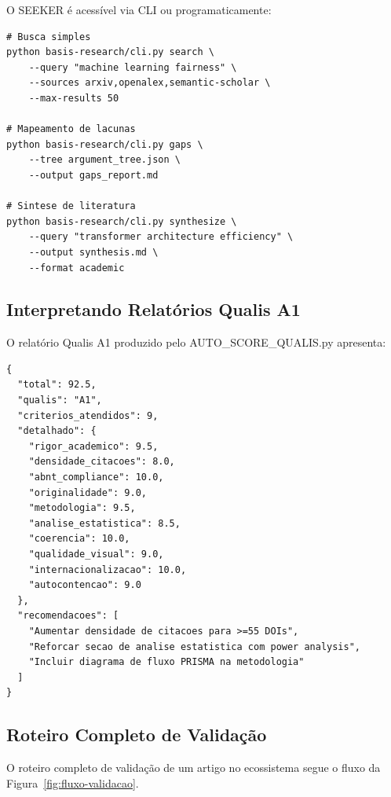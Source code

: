 O SEEKER é acessível via CLI ou programaticamente:

\begin{lstlisting}[caption={Pesquisa com SEEKER},
label={lst:run-seeker}, style=bashstyle]
# Busca simples
python basis-research/cli.py search \
    --query "machine learning fairness" \
    --sources arxiv,openalex,semantic-scholar \
    --max-results 50

# Mapeamento de lacunas
python basis-research/cli.py gaps \
    --tree argument_tree.json \
    --output gaps_report.md

# Sintese de literatura
python basis-research/cli.py synthesize \
    --query "transformer architecture efficiency" \
    --output synthesis.md \
    --format academic
\end{lstlisting}

\subsection{Interpretando Relatórios Qualis A1}

O relatório Qualis A1 produzido pelo AUTO\_SCORE\_QUALIS.py
apresenta:

\begin{lstlisting}[caption={Exemplo de Relatorio Qualis A1},
label={lst:qualis-report}, style=pythonstyle]
{
  "total": 92.5,
  "qualis": "A1",
  "criterios_atendidos": 9,
  "detalhado": {
    "rigor_academico": 9.5,
    "densidade_citacoes": 8.0,
    "abnt_compliance": 10.0,
    "originalidade": 9.0,
    "metodologia": 9.5,
    "analise_estatistica": 8.5,
    "coerencia": 10.0,
    "qualidade_visual": 9.0,
    "internacionalizacao": 10.0,
    "autocontencao": 9.0
  },
  "recomendacoes": [
    "Aumentar densidade de citacoes para >=55 DOIs",
    "Reforcar secao de analise estatistica com power analysis",
    "Incluir diagrama de fluxo PRISMA na metodologia"
  ]
}
\end{lstlisting}

\subsection{Roteiro Completo de Validação}

O roteiro completo de validação de um artigo no ecossistema segue
o fluxo da Figura~\ref{fig:fluxo-validacao}.

